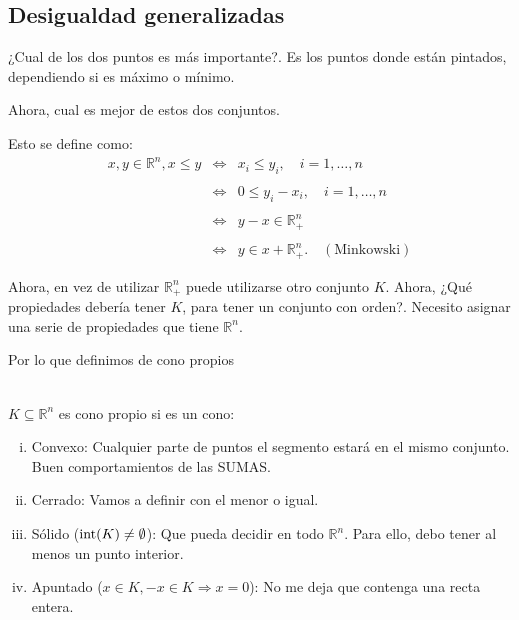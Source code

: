 \begin{paracol}{2}
\section{Desigualdad generalizadas}

¿Cual de los dos puntos es más importante?. Es los puntos donde están pintados, dependiendo si es máximo o mínimo.

\begin{center}
\end{center}

Ahora, cual es mejor de estos dos conjuntos.

Esto se define como:
$$
\begin{array}{rcl}
    x,y\in \mathbb{R}^n, x\leq y &\Leftrightarrow& x_i\leq y_i, \quad i=1,\ldots,n\\\\
				 &\Leftrightarrow& 0\leq y_i-x_i, \quad i=1,\ldots,n\\\\
				 &\Leftrightarrow& y-x\in \mathbb{R}^n_+\\\\
				 &\Leftrightarrow& y\in x+\mathbb{R}^n_+. \quad (\text{Minkowski})
\end{array}
$$

Ahora, en vez de utilizar $\mathbb{R}^n_+$ puede utilizarse otro conjunto $K$. Ahora, ¿Qué propiedades debería tener $K$, para tener un conjunto con orden?. Necesito asignar  una serie de propiedades que tiene $\mathbb{R}^n$.

Por lo que definimos de cono propios

\begin{def.}\,\\
    $K\subseteq \mathbb{R}^n$ es cono propio si es un cono:
    \begin{enumerate}[i)]
	\item Convexo: Cualquier parte de puntos el segmento estará en el mismo conjunto. Buen comportamientos de las SUMAS.
	\item Cerrado: Vamos a definir con el menor o igual.
	\item Sólido ($\mathop{\mbox{\normalfont int}}\nolimits(K)\neq \emptyset$): Que pueda decidir en todo $\mathbb{R}^n$. Para ello, debo tener al menos un punto interior.
	\item Apuntado ($x\in K,  -x\in K\Rightarrow x=0$): No me deja que contenga una recta entera.
    \end{enumerate}
\end{def.}


\end{paracol}
